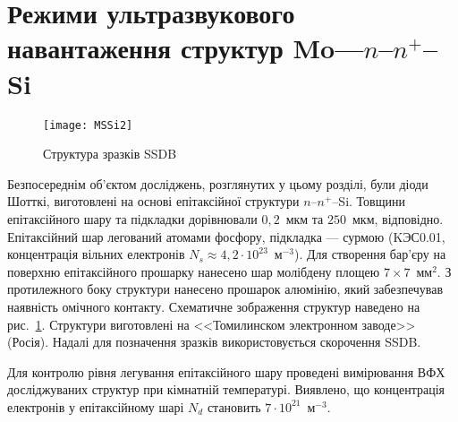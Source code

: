 %
%



\section{Режими ультразвукового навантаження структур Mo---$n$--$n^+$--Si\label{SSDB:Struc}}



\begin{figure}[b]
\center
\texttt{[image: MSSi2]}%
\caption{\label{figMSSi2}
Структура зразків SSDB
}
\end{figure}


Безпосереднім об'єктом досліджень, розглянутих у цьому розділі, були діоди Шотткі, виготовлені на основі епітаксійної
структури $n$--$n^+$--Si.
Товщини епітаксійного шару та підкладки дорівнювали $0,2$~мкм та $250$~мкм, відповідно.
Епітаксійний шар легований атомами фосфору, підкладка --- сурмою
(KЭС0.01, концентрація вільних електронів $N_s\approx4,2\cdot10^{23}$~м$^{-3}$).
Для створення бар'єру на поверхню епітаксійного прошарку нанесено шар молібдену площею $7\times7$~мм$^2$.
З протилежного боку структури нанесено прошарок алюмінію, який забезпечував наявність омічного контакту.
Схематичне зображення структур наведено на рис.~\ref{figMSSi2}.
Структури виготовлені на <<Томилинском электронном заводе>>  (Росія).
Надалі для позначення зразків використовується скорочення SSDB.

Для контролю рівня легування епітаксійного шару проведені
вимірювання ВФХ досліджуваних структур при кімнатній температурі.
Виявлено, що концентрація електронів у епітаксійному шарі $N_d$ становить $7\cdot10^{21}$~м$^{-3}$.


